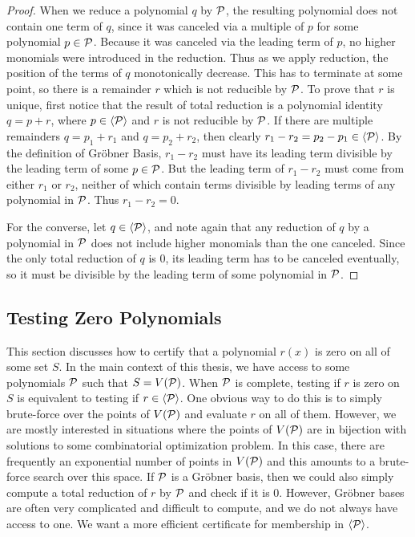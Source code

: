\begin{proof}
When we reduce a polynomial $q$ by $\mathcal P$, the resulting polynomial does not contain one term of $q$, since it was canceled via a multiple of $p$ for some polynomial $p \in \mathcal P$. Because it was canceled via the leading term of $p$, no higher monomials were introduced in the reduction. Thus as we apply reduction, the position of the terms of $q$ monotonically decrease. This has to terminate at some point, so there is a remainder $r$ which is not reducible by $\mathcal P$. To prove that $r$ is unique, first notice that the result of total reduction is a polynomial identity $q = p + r$, where $p \in \langle \mathcal P \rangle$ and $r$ is not reducible by $\mathcal P$. If there are multiple remainders $q = p_1 + r_1$ and $q = p_2 + r_2$, then clearly $r_1 - r_2 = p_2 - p_1 \in \langle \mathcal P \rangle$. By the definition of Gr\"obner Basis, $r_1 - r_2$ must have its leading term divisible by the leading term of some $p \in \mathcal P$. But the leading term of $r_1 - r_2$ must come from either $r_1$ or $r_2$, neither of which contain terms divisible by leading terms of any polynomial in $\mathcal P$. Thus $r_1 - r_2 = 0$.

For the converse, let $q \in \langle \mathcal P \rangle$, and note again that any reduction of $q$ by a polynomial in $\mathcal P$ does not include higher monomials than the one canceled. Since the only total reduction of $q$ is $0$, its leading term has to be canceled eventually, so it must be divisible by the leading term of some polynomial in $\mathcal P$.
\end{proof}

\subsection{Testing Zero Polynomials}

This section discusses how to certify that a polynomial $r(x)$ is zero on all of some set $S$.
In the main context of this thesis, we have access to some polynomials $\mathcal P$ such that $S = V(\mathcal P)$.
When $\mathcal P$ is complete, testing if $r$ is zero on $S$ is equivalent to testing if $r \in \langle \mathcal P \rangle$.
One obvious way to do this is to simply brute-force over the points of $V(\mathcal P)$ and evaluate $r$ on all of them.
However, we are mostly interested in situations where the points of $V(\mathcal P)$ are in bijection with solutions to some combinatorial optimization problem.
In this case, there are frequently an exponential number of points in $V(\mathcal P)$ and this amounts to a brute-force search over this space.
If $\mathcal P$ is a Gr\"obner basis, then we could also simply compute a total reduction of $r$ by $\mathcal P$ and check if it is $0$.
However, Gr\"obner bases are often very complicated and difficult to compute, and we do not always have access to one.
We want a more efficient certificate for membership in $\langle \mathcal P \rangle$.


